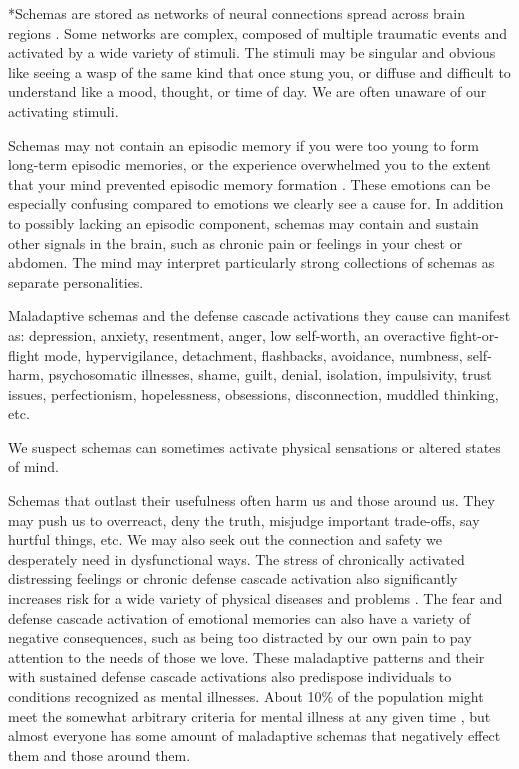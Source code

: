 \documentclass[12pt,letterpaper]{article}
\begin{document}
*Schemas are stored as networks of neural connections spread across brain regions \cite{eckerUnlocking}. Some networks are complex, composed of multiple traumatic events and activated by a wide variety of stimuli. The stimuli may be singular and obvious like seeing a wasp of the same kind that once stung you, or diffuse and difficult to understand like a mood, thought, or time of day. We are often unaware of our activating stimuli.

Schemas may not contain an episodic memory if you were too young to form long-term episodic memories, or the experience overwhelmed you to the extent that your mind prevented episodic memory formation \cite{vanderKolkBody,brownAttachmentDisturbances}. These emotions can be especially confusing compared to emotions we clearly see a cause for. In addition to possibly lacking an episodic component, schemas may contain and sustain other signals in the brain, such as chronic pain or feelings in your chest or abdomen. The mind may interpret particularly strong collections of schemas as separate personalities.

Maladaptive schemas and the defense cascade activations they cause can manifest as: depression, anxiety, resentment, anger, low self-worth, an overactive fight-or-flight mode, hypervigilance, detachment, flashbacks, avoidance, numbness, self-harm, psychosomatic illnesses, shame, guilt, denial, isolation, impulsivity, trust issues, perfectionism, hopelessness, obsessions, disconnection, muddled thinking, etc. 

We suspect schemas can sometimes activate physical sensations or altered states of mind.

Schemas that outlast their usefulness often harm us and those around us. They may push us to overreact, deny the truth, misjudge important trade-offs, say hurtful things, etc. We may also seek out the connection and safety we desperately need in dysfunctional ways. The stress of chronically activated distressing feelings or chronic defense cascade activation also significantly increases risk for a wide variety of physical diseases and problems \cite{felittiACE}.  The fear and defense cascade activation of emotional memories can also have a variety of negative consequences, such as being too distracted by our own pain to pay attention to the needs of those we love. These maladaptive patterns and their with sustained defense cascade activations also predispose individuals to conditions recognized as mental illnesses. About 10\% of the population might meet the somewhat arbitrary criteria for mental illness at any given time \cite{whoMentalHealth}, but almost everyone has some amount of maladaptive schemas that negatively effect them and those around them.
\end{document}
